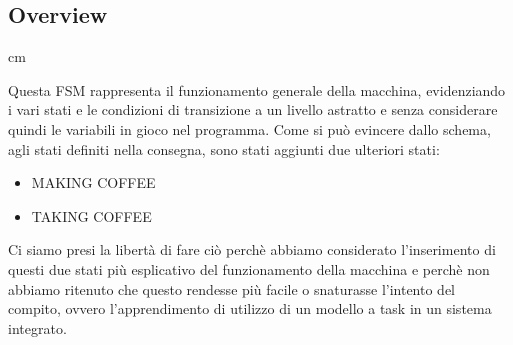 \documentclass{article}
\begin{document}
\subsection{Overview}
 cm
\begin{center}
\end{center}
Questa FSM rappresenta il funzionamento generale della macchina, evidenziando i vari stati e le condizioni di transizione a un livello astratto e senza considerare quindi le variabili in gioco nel programma. Come si può evincere dallo schema, agli stati definiti nella consegna, sono stati aggiunti due ulteriori stati:
\begin{itemize}
	\item MAKING COFFEE
	\item TAKING COFFEE
\end{itemize}
Ci siamo presi la libertà di fare ciò perchè abbiamo considerato l'inserimento di questi due stati più esplicativo del funzionamento della macchina e perchè non abbiamo ritenuto che questo rendesse più facile o snaturasse l'intento del compito, ovvero l'apprendimento di utilizzo di un modello a task in un sistema integrato.
\end{document}
